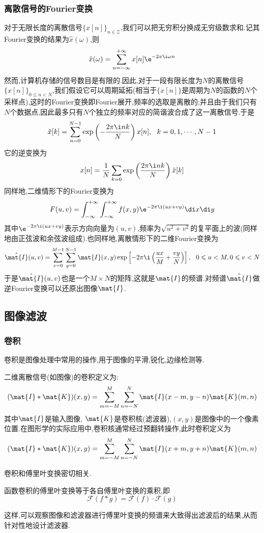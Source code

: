 \documentclass{ctexart}
\begin{document}
\subsubsection{离散信号的Fourier变换}
对于无限长度的离散信号$\{x[n]\}_{n\in\mathcal{Z}}$,我们可以把无穷积分换成无穷级数求和.记其Fourier变换的结果为$\hat{x}(\omega)$,则
\[\hat{x}(\omega)=\sum_{n=-\infty}^{+\infty}x[n]\e^{-2\pi\i\omega n}\]
\indent 然而,计算机存储的信号数目是有限的.因此,对于一段有限长度为$N$的离散信号$\{x[n]\}_{0\leqslant n< N}$,我们假设它可以周期延拓(相当于$\{x[n]\}$是周期为$N$的函数的$N$个采样点),这时的Fourier变换即Fourier展开,频率的选取是离散的;并且由于我们只有$N$个数据点,因此最多只有$N$个独立的频率对应的简谐波合成了这一离散信号.于是
\[\hat{x}[k]=\sum_{n=0}^{N-1}\exp\left(-\dfrac{2\pi\i nk}{N}\right)x[n],\ \ k=0,1,\cdots,N-1\]
它的逆变换为
\[x[n]=\dfrac{1}{N}\sum_{k=0}\exp\left(\dfrac{2\pi\i nk}{N}\right)\hat{x}[k]\]
同样地,二维情形下的Fourier变换为
\[F(u,v)=\int_{-\infty}^{+\infty}\int_{-\infty}^{+\infty}f(x,y)\e^{-2\pi\i(ux+vy)}\di x\di y\]
其中$\e^{-2\pi\i(ux+vy)}$表示方向向量为$(u,v)$,频率为$\sqrt{u^2+v^2}$的复平面上的波(同样地由正弦波和余弦波组成).也同样地,离散情形下的二维Fourier变换为
\[\hat{\mat{I}}(u,v)=\sum_{x=0}^{M-1}\sum_{y=0}^{N-1}\mat{I}(x,y)\exp\left[-2\pi\i\left(\dfrac{ux}{M}+\dfrac{vy}{N}\right)\right],\ \ 0\leqslant u<M,0\leqslant v<N\]
于是$\hat{\mat{I}}(u,v)$也是一个$M\times N$的矩阵,这就是$\mat{I}$的频谱.对频谱$\hat{\mat{I}}$做逆Fourier变换可以还原出图像$\mat{I}$.
\subsection{图像滤波}
\subsubsection{卷积}
卷积是图像处理中常用的操作,用于图像的平滑,锐化,边缘检测等.
\begin{definition}[卷积]
    二维离散信号(如图像)的卷积定义为:
    \[
        (\mat{I} * \mat{K})(x,y) = \sum_{m=-M}^{M} \sum_{n=-N}^{N} \mat{I}(x-m,y-n)\mat{K}(m,n)
    \]
    其中$\mat{I}$是输入图像, $\mat{K}$是卷积核(滤波器),$(x,y)$是图像中的一个像素位置.在图形学的实际应用中,卷积核通常经过预翻转操作,此时卷积定义为
    \[(\mat{I} * \mat{K})(x,y) = \sum_{m=-M}^{M} \sum_{n=-N}^{N} \mat{I}(x+m,y+n)\mat{K}(m,n)\]
\end{definition}
卷积和傅里叶变换密切相关.
\begin{theorem}[卷积定理]
    函数卷积的傅里叶变换等于各自傅里叶变换的乘积,即
    \[\mathcal{F}(f * g) = \mathcal{F}(f) \cdot \mathcal{F}(g)\]
\end{theorem}
这样,可以观察图像和滤波器进行傅里叶变换的频谱来大致得出滤波后的结果,从而针对性地设计滤波器.
\end{document}

